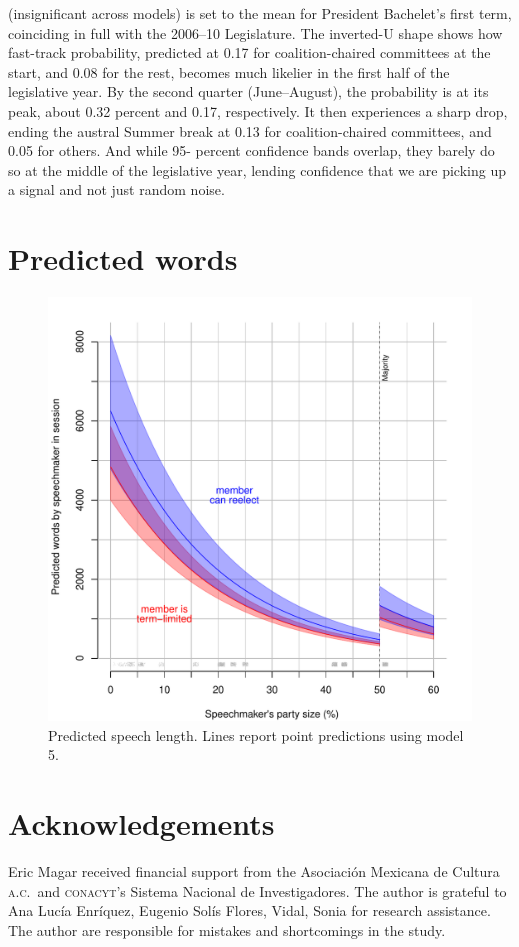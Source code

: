 \documentclass[letter,12pt]{article}
\begin{document}
(insignificant across models) is set to the mean for President Bachelet’s first term, coinciding in full
with the 2006–10 Legislature. The inverted-U shape shows how fast-track probability, predicted
at 0.17 for coalition-chaired committees at the start, and 0.08 for the rest, becomes much likelier
in the first half of the legislative year. By the second quarter (June–August), the probability is at
its peak, about 0.32 percent and 0.17, respectively. It then experiences a sharp drop, ending the
austral Summer break at 0.13 for coalition-chaired committees, and 0.05 for others. And while 95-
percent confidence bands overlap, they barely do so at the middle of the legislative year, lending
confidence that we are picking up a signal and not just random noise.


\section{Predicted words}

\begin{figure}
  \centering
    \includegraphics[width=.8\columnwidth]{../plots/predictedWords.pdf}
    \caption{Predicted speech length. Lines report point predictions using model 5.}\label{F:predict}
\end{figure}




\section*{Acknowledgements}
Eric Magar received financial support from the Asociaci\'on Mexicana de Cultura \textsc{a.c.}\ and \textsc{conacyt}'s Sistema Nacional de Investigadores. The author is grateful to Ana Lucía Enríquez, Eugenio Solís Flores, Vidal, Sonia for research assistance.  The author are responsible for mistakes and shortcomings in the study.
\end{document}
